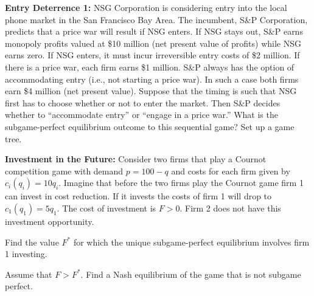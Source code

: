 \textbf{Entry Deterrence 1:} NSG Corporation is considering entry into the local phone
market in the San Francisco Bay Area. The incumbent, S\&P Corporation, predicts that a price war
will result if NSG enters. If NSG stays out, S\&P earns monopoly profits valued at \$10 million (net
present value of profits) while NSG earns zero. If NSG enters, it must incur irreversible entry
costs of \$2 million. If there is a price war, each firm earns \$1 million. S\&P always has the
option of accommodating entry (i.e., not starting a price war). In such a case both firms earn \$4
million (net present value). Suppose that the timing is such that NSG first has to choose whether or
not to enter the market. Then S\&P decides whether to ``accommodate entry'' or ``engage in a price
war.'' What is the subgame-perfect equilibrium outcome to this sequential game? Set up a game tree.
\resolespaco


\textbf{Investment in the Future:} Consider two firms that play a Cournot competition game
with demand $p = 100 - q$ and costs for each firm given by $c_i(q_i) = 10q_i$. Imagine that before
the two firms play the Cournot game firm 1 can invest in cost reduction. If it invests the costs of
firm 1 will drop to $c_1(q_1) = 5q_1$. The cost of investment is $F > 0$. Firm 2 does not have this
investment opportunity.
\begin{partes}
\item Find the value $F^*$ for which the unique subgame-perfect equilibrium involves firm 1
investing.
\item Assume that $F > F^*$. Find a Nash equilibrium of the game that is not subgame perfect.
\end{partes}
\resolespaco


